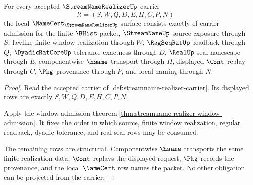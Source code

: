 \begin{theorem}
\label{thm:streamname-realizer-namecert-obligations}
For every accepted $\StreamNameRealizerUp$ carrier
$$
R=(S,W,Q,D,E,H,C,P,N),
$$
the local $\NameCert_{\StreamNameRealizerUp}$ surface consists exactly of carrier admission for the finite $\BHist$ packet, $\StreamNameUp$ source exposure through $S$, lawlike finite-window realization through $W$, $\RegSeqRatUp$ readback through $Q$, $\DyadicRatCoreUp$ tolerance exactness through $D$, $\RealUp$ seal nonescape through $E$, componentwise $\hsame$ transport through $H$, displayed $\Cont$ replay through $C$, $\Pkg$ provenance through $P$, and local naming through $N$.
\end{theorem}
\begin{proof}
Read the accepted carrier of \autoref{def:streamname-realizer-carrier}. Its displayed rows are exactly $S,W,Q,D,E,H,C,P,N$.

Apply the window-admission theorem \autoref{thm:streamname-realizer-window-admission}. It fixes the order in which source, finite window realization, regular readback, dyadic tolerance, and real seal rows may be consumed.

The remaining rows are structural. Componentwise $\hsame$ transports the same finite realization data, $\Cont$ replays the displayed request, $\Pkg$ records the provenance, and the local $\NameCert$ row names the packet. No other obligation can be projected from the carrier.
\end{proof}

\begin{closurestatus}{\StreamNameRealizerUp}
  \theoryclosure{\obligationClosure}
  \formalstatus{\unformalizedV}
\end{closurestatus}
